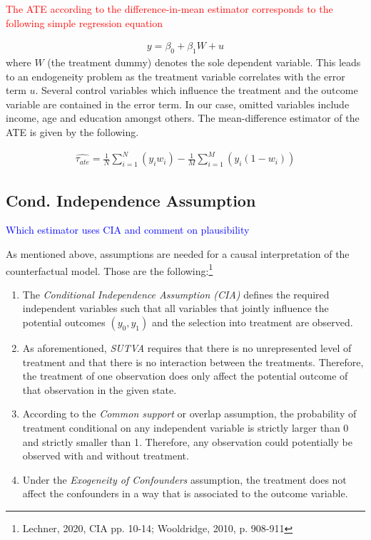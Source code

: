 \documentclass{article}
\begin{document}
\textcolor{red}{The ATE according to the difference-in-mean estimator corresponds to the following simple regression equation}

\begin{align}
    y = \beta_{0} + \beta_{1}W + u
\end{align}
where $W$ (the treatment dummy) denotes the sole dependent variable.
This leads to an endogeneity problem as the treatment variable correlates with the error term $u$. Several control variables which influence the treatment and the outcome variable are contained in the error term. In our case, omitted variables include income, age and education amongst others. \newline
The mean-difference estimator of the ATE is given by the following.

\begin{align}
    \widehat{\tau_{ate}} = \frac{1}{N} \sum_{i=1}^{N} \left( y_i w_i \right) -  \frac{1}{M} \sum_{i=1}^{M} \left(y_i  (1-w_i) \right)
\end{align}

\subsection{Cond. Independence Assumption}
\textcolor{blue}{Which estimator uses CIA and comment on plausibility}\newline

As mentioned above, assumptions are needed for a causal interpretation of the counterfactual model. Those are the following:\footnote{Lechner, 2020, CIA pp. 10-14; Wooldridge, 2010, p. 908-911}

\begin{enumerate}
    \item The \textit{Conditional Independence Assumption (CIA)} defines the required independent variables such that all variables that jointly influence the potential outcomes $(y_0, y_1)$ and the selection into treatment are observed.
    \item As aforementioned, \textit{SUTVA} requires that there is no unrepresented level of treatment and that there is no interaction between the treatments. Therefore, the treatment of one observation does only affect the potential outcome of that observation in the given state.
    \item According to the \textit{Common support} or overlap assumption, the probability of treatment conditional on any independent variable is strictly larger than 0 and strictly smaller than 1. Therefore, any observation could potentially be observed with and without treatment.
    \item Under the \textit{Exogeneity of Confounders} assumption, the treatment does not affect the confounders in a way that is associated to the outcome variable.
\end{enumerate}
\end{document}
